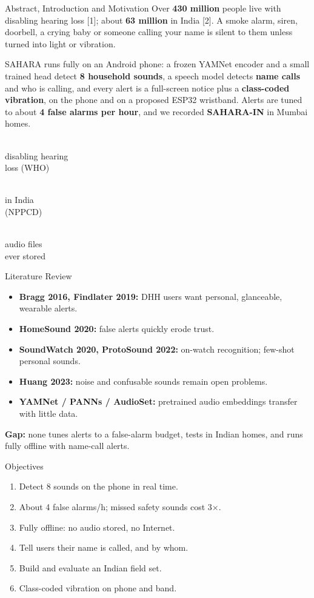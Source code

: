 \documentclass{article}
\newcommand{\bignum}[2]{\begin{minipage}[t]{0.32\linewidth}\centering{\fontsize{44}{46}\selectfont\bfseries\rmfamily\color{nm}#1}\\[1mm]{\fontsize{17}{19}\selectfont #2}\end{minipage}}
\begin{document}
\begin{minipage}[t]{0.235\linewidth}\vspace{0pt}
\begin{psec}{Abstract, Introduction and Motivation}
Over \textbf{430 million} people live with disabling hearing loss [1]; about \textbf{63 million} in India [2]. A smoke alarm, siren, doorbell, a crying baby or someone calling your name is silent to them unless turned into light or vibration.

SAHARA runs fully on an Android phone: a frozen YAMNet encoder and a small trained head detect \textbf{8 household sounds}, a speech model detects \textbf{name calls} and who is calling, and every alert is a full-screen notice plus a \textbf{class-coded vibration}, on the phone and on a proposed ESP32 wristband. Alerts are tuned to about \textbf{4 false alarms per hour}, and we recorded \textbf{SAHARA-IN} in Mumbai homes.

\vspace{3mm}
\bignum{430\,M}{disabling hearing\\loss (WHO)}\hfill\bignum{63\,M}{in India\\(NPPCD)}\hfill\bignum{0}{audio files\\ever stored}
\end{psec}

\begin{psec}{Literature Review}
\begin{itemize}
\item \textbf{Bragg 2016, Findlater 2019:} DHH users want personal, glanceable, wearable alerts.
\item \textbf{HomeSound 2020:} false alerts quickly erode trust.
\item \textbf{SoundWatch 2020, ProtoSound 2022:} on-watch recognition; few-shot personal sounds.
\item \textbf{Huang 2023:} noise and confusable sounds remain open problems.
\item \textbf{YAMNet / PANNs / AudioSet:} pretrained audio embeddings transfer with little data.
\end{itemize}
\textbf{Gap:} none tunes alerts to a false-alarm budget, tests in Indian homes, and runs fully offline with name-call alerts.
\end{psec}

\begin{psec}{Objectives}
\begin{enumerate}[leftmargin=8mm, itemsep=2pt]
\item Detect 8 sounds on the phone in real time.
\item About 4 false alarms/h; missed safety sounds cost 3$\times$.
\item Fully offline: no audio stored, no Internet.
\item Tell users their name is called, and by whom.
\item Build and evaluate an Indian field set.
\item Class-coded vibration on phone and band.
\end{enumerate}
\end{psec}
\end{minipage}\hfill
\end{document}
